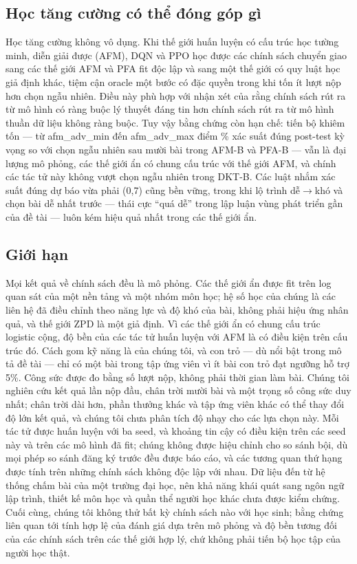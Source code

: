\subsection{Học tăng cường có thể đóng góp gì}

Học tăng cường không vô dụng. Khi thế giới huấn luyện có cấu trúc học tường minh, diễn giải được (AFM), DQN và PPO học được các chính sách chuyển giao sang các thế giới AFM và PFA fit độc lập và sang một thế giới có quy luật học giả định khác, tiệm cận oracle một bước có đặc quyền trong khi tốn ít lượt nộp hơn chọn ngẫu nhiên. Điều này phù hợp với nhận xét của \citet{doroudi2019reward} rằng chính sách rút ra từ mô hình có ràng buộc lý thuyết đáng tin hơn chính sách rút ra từ mô hình thuần dữ liệu không ràng buộc. Tuy vậy bằng chứng còn hạn chế: tiến bộ khiêm tốn — từ {{afm_adv_min}} đến {{afm_adv_max}} điểm \% xác suất đúng post-test kỳ vọng so với chọn ngẫu nhiên sau mười bài trong AFM-B và PFA-B — vẫn là đại lượng mô phỏng, các thế giới ẩn có chung cấu trúc với thế giới AFM, và chính các tác tử này không vượt chọn ngẫu nhiên trong DKT-B. Các luật nhắm xác suất đúng dự báo vừa phải (0,7) cũng bền vững, trong khi lộ trình dễ$\to$khó và chọn bài dễ nhất trước — thái cực ``quá dễ'' trong lập luận vùng phát triển gần của đề tài — luôn kém hiệu quả nhất trong các thế giới ẩn.

\subsection{Giới hạn}

Mọi kết quả về chính sách đều là mô phỏng. Các thế giới ẩn được fit trên log quan sát của một nền tảng và một nhóm môn học; hệ số học của chúng là các liên hệ đã điều chỉnh theo năng lực và độ khó của bài, không phải hiệu ứng nhân quả, và thế giới ZPD là một giả định. Vì các thế giới ẩn có chung cấu trúc logistic cộng, độ bền của các tác tử huấn luyện với AFM là có điều kiện trên cấu trúc đó. Cách gom kỹ năng là của chúng tôi, và con trỏ — dù nổi bật trong mô tả đề tài — chỉ có một bài trong tập ứng viên vì ít bài con trỏ đạt ngưỡng hỗ trợ 5\%. Công sức được đo bằng số lượt nộp, không phải thời gian làm bài. Chúng tôi nghiên cứu kết quả lần nộp đầu, chân trời mười bài và một trọng số công sức duy nhất; chân trời dài hơn, phần thưởng khác và tập ứng viên khác có thể thay đổi độ lớn kết quả, và chúng tôi chưa phân tích độ nhạy cho các lựa chọn này. Mỗi tác tử được huấn luyện với ba seed, và khoảng tin cậy có điều kiện trên các seed này và trên các mô hình đã fit; chúng không được hiệu chỉnh cho so sánh bội, dù mọi phép so sánh đăng ký trước đều được báo cáo, và các tương quan thứ hạng được tính trên những chính sách không độc lập với nhau. Dữ liệu đến từ hệ thống chấm bài của một trường đại học, nên khả năng khái quát sang ngôn ngữ lập trình, thiết kế môn học và quần thể người học khác chưa được kiểm chứng. Cuối cùng, chúng tôi không thử bất kỳ chính sách nào với học sinh; bằng chứng liên quan tới tính hợp lệ của đánh giá dựa trên mô phỏng và độ bền tương đối của các chính sách trên các thế giới hợp lý, chứ không phải tiến bộ học tập của người học thật.
